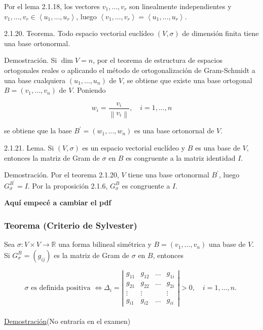 \documentclass[12pt, a4paper, ones, notitlepage, openany,titlepage]{article}
\newcommand{\demostracion}{\noindent\underline{Demostración}}
\begin{document}
Por el lema 2.1.18, los vectores $v_{1}, \ldots, v_{r}$ son linealmente independientes y $v_{1}, \ldots, v_{r} \in\left\langle u_{1}, \ldots, u_{r}\right\rangle$, luego $\left\langle v_{1}, \ldots, v_{r}\right\rangle=\left\langle u_{1}, \ldots, u_{r}\right\rangle$.

2.1.20. Teorema. Todo espacio vectorial euclídeo $(V, \sigma)$ de dimensión finita tiene una base ortonormal.

Demostración. Si $\operatorname{dim} V=n$, por el teorema de estructura de espacios ortogonales reales o aplicando el método de ortogonalización de Gram-Schmidt a una base cualquiera $\left(u_{1}, \ldots, u_{n}\right)$ de $V$, se obtiene que existe una base ortogonal $B=\left(v_{1}, \ldots, v_{n}\right)$ de $V$. Poniendo

$$
w_{i}=\frac{v_{i}}{\left\|v_{i}\right\|}, \quad i=1, \ldots, n
$$

se obtiene que la base $B^{\prime}=\left(w_{1}, \ldots, w_{n}\right)$ es una base ortonornal de $V$.

2.1.21. Lema. Si $(V, \sigma)$ es un espacio vectorial euclídeo y $B$ es una base de $V$, entonces la matriz de Gram de $\sigma$ en $B$ es congruente a la matriz identidad $I$.

Demostración. Por el teorema 2.1.20, $V$ tiene una base ortonormal $B^{\prime}$, luego $G_{\sigma}^{B^{\prime}}=I$. Por la proposición 2.1.6, $G_{\sigma}^{B}$ es congruente a $I$.

\begin{huge}
	\textbf{Aquí empecé a cambiar el pdf}
\end{huge}

\subsubsection{Teorema (Criterio de Sylvester)} Sea $\sigma: V \times V \rightarrow \mathbb{R}$ una forma bilineal simétrica y $B=\left(v_{1}, \ldots, v_{n}\right)$ una base de $V$. Si $G_{\sigma}^{B}=\left(g_{i j}\right)$ es la matriz de Gram de $\sigma$ en $B$, entonces

$$
\sigma \text { es definida positiva } \Longleftrightarrow \Delta_{i}=\left|\begin{array}{cccc}
	g_{11} & g_{12} & \ldots & g_{1 i} \\
	g_{21} & g_{22} & \ldots & g_{2 i} \\
	\vdots & \vdots & & \vdots \\
	g_{i 1} & g_{i 2} & \ldots & g_{i i}
\end{array}\right|>0, \quad i=1, \ldots, n \text {. }
$$\\
\demostracion (No entraría en el examen)
\end{document}
